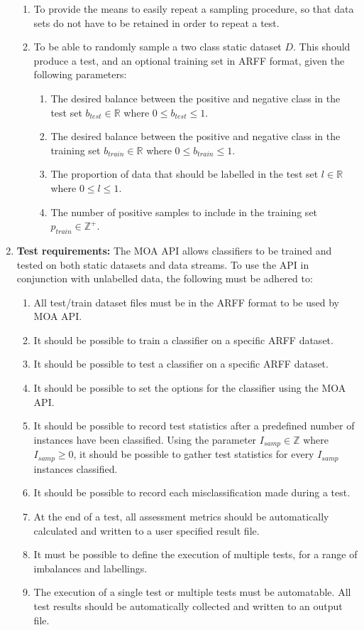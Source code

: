 \documentclass[twoside,a4paper]{refart}
\begin{document}
\begin{enumerate}
\begin{enumerate}
\item To provide the means to easily repeat a sampling procedure, so that data sets do not have to be retained in order to repeat a test.
\item To be able to randomly sample a two class static dataset $D$. This should produce a test, and an optional training set in ARFF format, given the following parameters:
	\begin{enumerate}
	\item The desired balance between the positive and negative class in the test set $b_{test} \in \mathbb{R}$ where $0 \leq b_{test} \leq 1$.
	\item The desired balance between the positive and negative class in the training set $b_{train}\in \mathbb{R}$ where $0 \leq b_{train} \leq 1$.
	\item The proportion of data that should be labelled in the test set $l\in \mathbb{R}$ where $0 \leq l \leq 1$.
	\item The number of positive samples to include in the training set $p_{train}\in \mathbb{Z}^{+}$.
	\end{enumerate}
\end{enumerate}

\item\textbf{Test requirements:} The MOA API allows classifiers to be trained and tested on both static datasets and data streams. To use the API in conjunction with unlabelled data, the following must be adhered to:
\begin{enumerate}
\item All test/train dataset files must be in the ARFF format to be used by MOA API.
\item It should be possible to train a classifier on a specific ARFF dataset.
\item It should be possible to test a classifier on a specific ARFF dataset.
\item It should be possible to set the options for the classifier using the MOA API.
\item It should be possible to record test statistics after a predefined number of instances have been classified. Using the parameter $I_{samp} \in \mathbb{Z}$ where $I_{samp} \geq 0$, it should be possible to gather test statistics for every $I_{samp}$ instances classified.
\item It should be possible to record each misclassification made during a test.
\item At the end of a test, all assessment metrics should be automatically calculated and written to a user specified result file.
\item It must be possible to define the execution of multiple tests, for a range of imbalances and labellings.
\item The execution of a single test or multiple tests must be automatable. All test results should be automatically collected and written to an output file.
\end{enumerate}


\end{enumerate}
\end{document}
